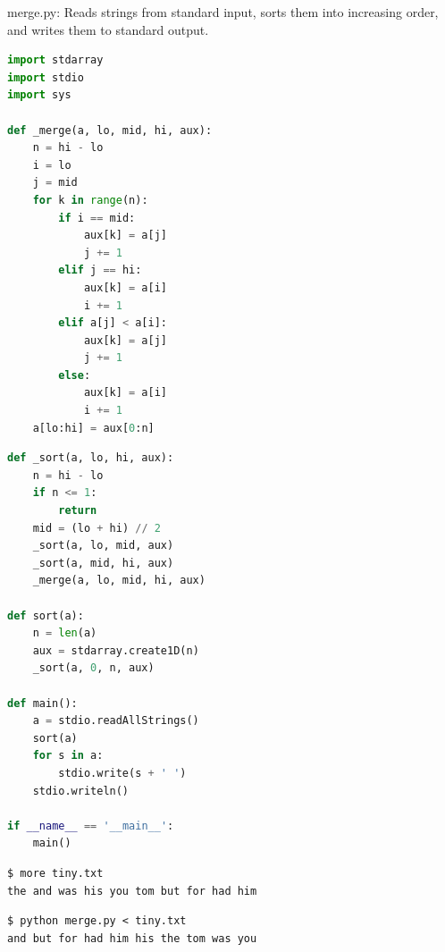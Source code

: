 \documentclass[8pt,a4paper,compress,handout]{beamer}
\begin{document}
\begin{frame}[fragile]
\begin{framed}
\tiny merge.py: Reads strings from standard input, sorts them into increasing order, and writes them to standard output.
\end{framed}

\begin{lstlisting}[language=Python]
import stdarray
import stdio
import sys

def _merge(a, lo, mid, hi, aux):
    n = hi - lo
    i = lo
    j = mid
    for k in range(n):
        if i == mid:
            aux[k] = a[j]
            j += 1
        elif j == hi:
            aux[k] = a[i]
            i += 1
        elif a[j] < a[i]:
            aux[k] = a[j]
            j += 1
        else:
            aux[k] = a[i]
            i += 1
    a[lo:hi] = aux[0:n]
\end{lstlisting}
\end{frame}

\begin{frame}[fragile]
\begin{lstlisting}[language=Python]
def _sort(a, lo, hi, aux):
    n = hi - lo
    if n <= 1:
        return
    mid = (lo + hi) // 2
    _sort(a, lo, mid, aux)
    _sort(a, mid, hi, aux)
    _merge(a, lo, mid, hi, aux)

def sort(a):
    n = len(a)
    aux = stdarray.create1D(n)
    _sort(a, 0, n, aux)

def main():
    a = stdio.readAllStrings()
    sort(a)
    for s in a:
        stdio.write(s + ' ')
    stdio.writeln()

if __name__ == '__main__':
    main()
\end{lstlisting}

\begin{lstlisting}[language={}]
$ more tiny.txt 
the and was his you tom but for had him
\end{lstlisting}

\begin{lstlisting}[language={}]
$ python merge.py < tiny.txt 
and but for had him his the tom was you 
\end{lstlisting}
\end{frame}
\end{document}
